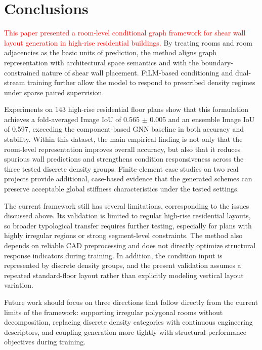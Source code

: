\section{Conclusions}
\label{sec:conclusion}

\textcolor{red}{This paper presented a room-level conditional graph framework for shear wall layout generation in high-rise residential buildings.} By treating rooms and room adjacencies as the basic units of prediction, the method aligns graph representation with architectural space semantics and with the boundary-constrained nature of shear wall placement. FiLM-based conditioning and dual-stream training further allow the model to respond to prescribed density regimes under sparse paired supervision.

Experiments on 143 high-rise residential floor plans show that this formulation achieves a fold-averaged Image IoU of 0.565 $\pm$ 0.005 and an ensemble Image IoU of 0.597, exceeding the component-based GNN baseline in both accuracy and stability. Within this dataset, the main empirical finding is not only that the room-level representation improves overall accuracy, but also that it reduces spurious wall predictions and strengthens condition responsiveness across the three tested discrete density groups. Finite-element case studies on two real projects provide additional, case-based evidence that the generated schemes can preserve acceptable global stiffness characteristics under the tested settings.

The current framework still has several limitations, corresponding to the issues discussed above. Its validation is limited to regular high-rise residential layouts, so broader typological transfer requires further testing, especially for plans with highly irregular regions or strong segment-level constraints. The method also depends on reliable CAD preprocessing and does not directly optimize structural response indicators during training. In addition, the condition input is represented by discrete density groups, and the present validation assumes a repeated standard-floor layout rather than explicitly modeling vertical layout variation.

Future work should focus on three directions that follow directly from the current limits of the framework: supporting irregular polygonal rooms without decomposition, replacing discrete density categories with continuous engineering descriptors, and coupling generation more tightly with structural-performance objectives during training.
